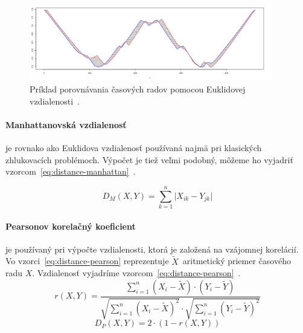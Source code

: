 \documentclass[a4paper,twoside,slovak,12pt,appendix]{article}
\begin{document}
\begin{figure}[htbp]
  \centering
  \includegraphics[width=0.95\textwidth]{euclidean-distance.png}
  \caption{Príklad porovnávania časových radov pomocou Euklidovej vzdialenosti~\cite{Malinowski2017}.}
  \label{fig:euclidean-distance}
\end{figure}

\paragraph{Manhattanovská vzdialenosť} je rovnako ako Euklidova vzdialenosť
používaná najmä pri klasických zhlukovacích problémoch. Výpočet je tiež veľmi
podobný, môžeme ho vyjadriť vzorcom~\ref{eq:distance-manhattan}~\cite{Craw2017}.

\begin{equation}
	\label{eq:distance-manhattan}
  D_M \left( X, Y \right) = \sum_{k=1}^{n} \lvert X_{ik} - Y_{jk} \rvert
\end{equation}

\paragraph{Pearsonov korelačný koeficient} je používaný pri výpočte
vzdialenosti, ktorá je založená na vzájomnej korelácií. Vo
vzorci~\ref{eq:distance-pearson} reprezentuje $\widetilde{X}$~aritmetický
priemer časového radu $X$. Vzdialenosť vyjadríme
vzorcom~\ref{eq:distance-pearson}~\cite{WarrenLiao2005}.
\begin{equation}
	\label{eq:distance-pearson}
  r \left( X, Y \right) = \frac
  { \sum_{i=1}^{n} \left( X_{i} - \widetilde{X} \right) \cdot \left( Y_{i} - \widetilde{Y} \right) }
  { \sqrt{\sum_{i=1}^{n} \left( X_{i} - \widetilde{X} \right)^2 } \cdot \sqrt{\sum_{i=1}^{n} \left( Y_{i} - \widetilde{Y} \right)^2 } }
\end{equation}
\begin{equation}
	\label{eq:distance-golay}
  D_P \left( X, Y \right) = 2 \cdot \left( 1 - r \left( X, Y \right) \right)
\end{equation}
\end{document}
